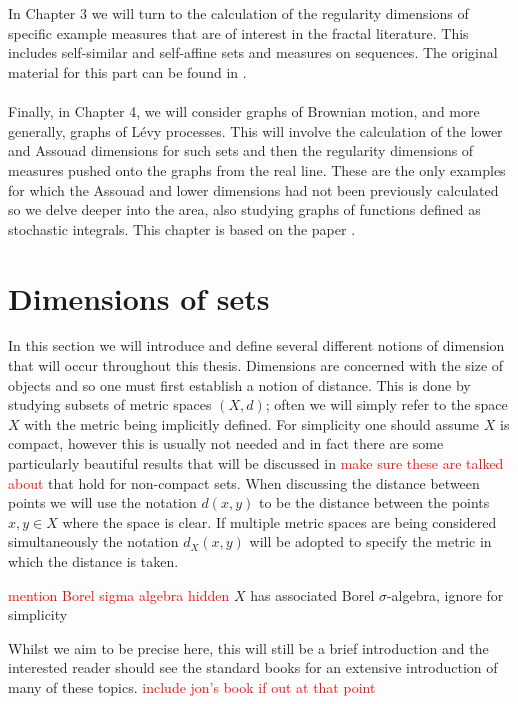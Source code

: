 \\ \\
In Chapter 3 we will turn to the calculation of the regularity dimensions of specific example measures that are of interest in the fractal literature. This includes self-similar and self-affine sets and measures on sequences. The original material for this part can be found in \cite{fraser-howroyd}. 
\\ \\
Finally, in Chapter 4, we will consider graphs of Brownian motion, and more generally, graphs of L\'evy processes. This will involve the calculation of the lower and Assouad dimensions for such sets and then the regularity dimensions of measures pushed onto the graphs from the real line. These are the only examples for which the Assouad and lower dimensions had not been previously calculated so we delve deeper into the area, also studying graphs of functions defined as stochastic integrals. This chapter is based on the paper \cite{howroyd-yu}.






\section{Dimensions of sets}
\label{sec:intro-sets}

In this section we will introduce and define several different notions of dimension that will occur throughout this thesis. Dimensions are concerned with the size of objects and so one must first establish a notion of distance. This is done by studying subsets of metric spaces $(X,d)$; often we will simply refer to the space $X$ with the metric being implicitly defined. For simplicity one should assume $X$ is compact, however this is usually not needed and in fact there are some particularly beautiful results that will be discussed in \label{sec:intro-ass} \textcolor{red}{make sure these are talked about} that hold for non-compact sets. When discussing the distance between points we will use the notation $d(x,y)$ to be the distance between the points $x,y \in X$ where the space is clear. If multiple metric spaces are being considered simultaneously the notation $d_X(x,y)$ will be adopted to specify the metric in which the distance is taken. 

\textcolor{red}{mention Borel sigma algebra hidden}
$X$ has associated Borel $\sigma$-algebra, ignore for simplicity

Whilst we aim to be precise here, this will still be a brief introduction and the interested reader should see the standard books \cite{falconer, falconer2, mattila} for an extensive introduction of many of these topics. \textcolor{red}{include jon's book if out at that point} 



